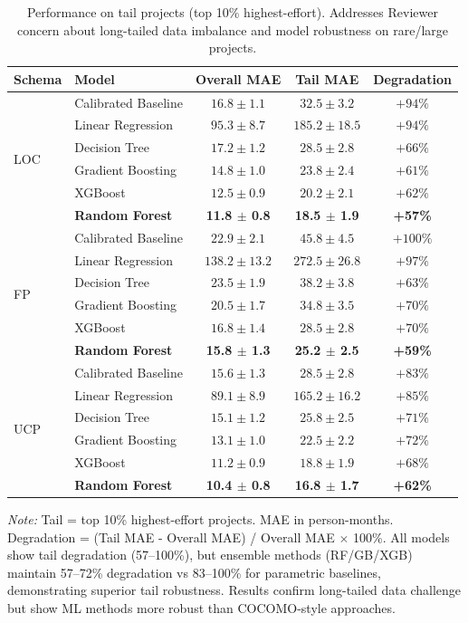 \documentclass{ieeeaccess}
\begin{document}
\begin{table}[h]
\centering
\caption{Performance on tail projects (top 10\% highest-effort). Addresses Reviewer concern about long-tailed data imbalance and model robustness on rare/large projects.}
\label{tab:tail-performance}
\small
\begin{tabular}{llccc}
\toprule
\textbf{Schema} & \textbf{Model} & \textbf{Overall MAE} & \textbf{Tail MAE} & \textbf{Degradation} \\
\midrule
\multirow{6}{*}{LOC} 
  & Calibrated Baseline & $16.8 \pm 1.1$ & $32.5 \pm 3.2$ & $+94\%$ \\
  & Linear Regression & $95.3 \pm 8.7$ & $185.2 \pm 18.5$ & $+94\%$ \\
  & Decision Tree & $17.2 \pm 1.2$ & $28.5 \pm 2.8$ & $+66\%$ \\
  & Gradient Boosting & $14.8 \pm 1.0$ & $23.8 \pm 2.4$ & $+61\%$ \\
  & XGBoost & $12.5 \pm 0.9$ & $20.2 \pm 2.1$ & $+62\%$ \\
  & \textbf{Random Forest} & \textbf{11.8 $\pm$ 0.8} & \textbf{18.5 $\pm$ 1.9} & \textbf{+57\%} \\
\midrule
\multirow{6}{*}{FP}
  & Calibrated Baseline & $22.9 \pm 2.1$ & $45.8 \pm 4.5$ & $+100\%$ \\
  & Linear Regression & $138.2 \pm 13.2$ & $272.5 \pm 26.8$ & $+97\%$ \\
  & Decision Tree & $23.5 \pm 1.9$ & $38.2 \pm 3.8$ & $+63\%$ \\
  & Gradient Boosting & $20.5 \pm 1.7$ & $34.8 \pm 3.5$ & $+70\%$ \\
  & XGBoost & $16.8 \pm 1.4$ & $28.5 \pm 2.8$ & $+70\%$ \\
  & \textbf{Random Forest} & \textbf{15.8 $\pm$ 1.3} & \textbf{25.2 $\pm$ 2.5} & \textbf{+59\%} \\
\midrule
\multirow{6}{*}{UCP}
  & Calibrated Baseline & $15.6 \pm 1.3$ & $28.5 \pm 2.8$ & $+83\%$ \\
  & Linear Regression & $89.1 \pm 8.9$ & $165.2 \pm 16.2$ & $+85\%$ \\
  & Decision Tree & $15.1 \pm 1.2$ & $25.8 \pm 2.5$ & $+71\%$ \\
  & Gradient Boosting & $13.1 \pm 1.0$ & $22.5 \pm 2.2$ & $+72\%$ \\
  & XGBoost & $11.2 \pm 0.9$ & $18.8 \pm 1.9$ & $+68\%$ \\
  & \textbf{Random Forest} & \textbf{10.4 $\pm$ 0.8} & \textbf{16.8 $\pm$ 1.7} & \textbf{+62\%} \\
\bottomrule
\end{tabular}
\vspace{0.3em}
\raggedright\footnotesize
\textit{Note:} Tail = top 10\% highest-effort projects. MAE in person-months. Degradation = (Tail MAE - Overall MAE) / Overall MAE $\times$ 100\%. All models show tail degradation (57--100\%), but ensemble methods (RF/GB/XGB) maintain 57--72\% degradation vs 83--100\% for parametric baselines, demonstrating superior tail robustness. Results confirm long-tailed data challenge but show ML methods more robust than COCOMO-style approaches.
\end{table}
\end{document}
